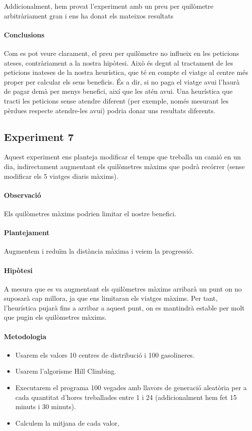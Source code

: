 \documentclass[a4paper]{article}
\begin{document}
Addicionalment, hem provat l'experiment amb un preu per quilòmetre arbitràriament gran i ens ha donat els mateixos resultats

\paragraph{Conclusions} Com es pot veure clarament, el preu per quilòmetre no influeix en les peticions ateses, contràriament a la nostra hipòtesi. Això és degut al tractament de les peticions inateses de la nostra heurística, que té en compte el viatge al centre més proper per calcular els seus beneficis. És a dir, si no paga el viatge avui l'haurà de pagar demà per menys benefici, així que les atén avui. Una heurística que tracti les peticions sense atendre diferent (per exemple, només mesurant les pèrdues respecte atendre-les avui) podria donar uns resultats diferents.

\newpage

\subsection{Experiment 7}
Aquest experiment ens planteja modificar el temps que treballa un camió en un dia, indirectament augmentant els quilòmetres màxims que podrà recórrer (sense modificar els 5 viatges diaris màxims).
\paragraph{Observació} Els quilòmetres màxims podrien limitar el nostre benefici.
\paragraph{Plantejament} Augmentem i reduïm la distància màxima i veiem la progressió.
\paragraph{Hipòtesi} A mesura que es va augmentant els quilòmetres màxims arribarà un punt on no suposarà cap millora, ja que ens limitaran els viatges màxims. Per tant, l'heurística pujarà fins a arribar a aquest punt, on es mantindrà estable per molt que pugin els quilòmetres màxims.
\paragraph{Metodologia}
\begin{itemize}
\item Usarem els valors 10 centres de distribució i 100 gasolineres.
\item Usarem l'algorisme Hill Climbing.
\item Executarem el programa 100 vegades amb llavors de generació aleatòria per a cada quantitat d'hores treballades entre 1 i 24 (addicionalment hem fet 15 minuts i 30 minuts).
\item Calculem la mitjana de cada valor,
\end{itemize}
\end{document}
